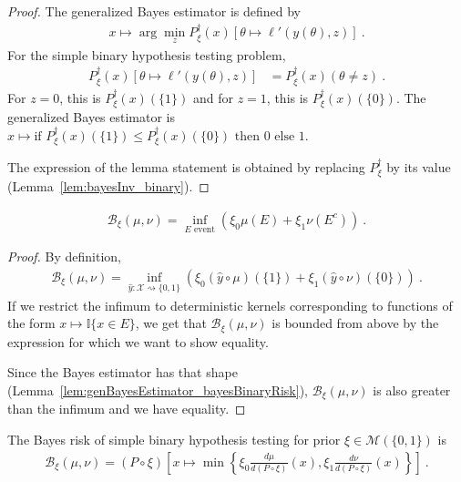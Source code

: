 \begin{proof}%
{}
The generalized Bayes estimator is defined by
\begin{align*}
x \mapsto \arg\min_z P_\xi^\dagger(x)\left[\theta \mapsto \ell'(y(\theta), z)\right] \: .
\end{align*}
For the simple binary hypothesis testing problem,
\begin{align*}
P_\xi^\dagger(x)\left[\theta \mapsto \ell'(y(\theta), z)\right]
&= P_\xi^\dagger(x)(\theta \ne z)
\: .
\end{align*}
For $z = 0$, this is $P_\xi^\dagger(x)(\{1\})$ and for $z = 1$, this is $P_\xi^\dagger(x)(\{0\})$.
The generalized Bayes estimator is $x \mapsto \text{if } P_\xi^\dagger(x)(\{1\}) \le P_\xi^\dagger(x)(\{0\}) \text{ then } 0 \text{ else } 1$.

The expression of the lemma statement is obtained by replacing $P_\xi^\dagger$ by its value (Lemma~\ref{lem:bayesInv_binary}).
\end{proof}


\begin{lemma}
  \label{lem:bayesBinaryRisk_eq_event}
  \leanok
  \begin{align*}
  \mathcal B_\xi(\mu, \nu) = \inf_{E \text{ event}} \left( \xi_0 \mu(E) + \xi_1 \nu(E^c) \right) \: .
  \end{align*}
\end{lemma}

\begin{proof}%
{}
By definition,
\begin{align*}
\mathcal B_\xi(\mu, \nu)
= \inf_{\hat{y} : \mathcal X \rightsquigarrow \{0,1\}}\left(\xi_0 (\hat{y} \circ \mu)(\{1\}) + \xi_1 (\hat{y} \circ \nu)(\{0\})\right)
\: .
\end{align*}
If we restrict the infimum to deterministic kernels corresponding to functions of the form $x \mapsto \mathbb{I}\{x \in E\}$, we get that $\mathcal B_\xi(\mu, \nu)$ is bounded from above by the expression for which we want to show equality.

Since the Bayes estimator has that shape (Lemma~\ref{lem:genBayesEstimator_bayesBinaryRisk}), $\mathcal B_\xi(\mu, \nu)$ is also greater than the infimum and we have equality.
\end{proof}


\begin{theorem}
  \label{thm:bayesBinaryRisk_eq}
  The Bayes risk of simple binary hypothesis testing for prior $\xi \in \mathcal M(\{0,1\})$ is
  \begin{align*}
  \mathcal B_\xi(\mu, \nu) = (P \circ \xi)\left[x \mapsto \min \left\{\xi_0\frac{d \mu}{d(P \circ \xi)}(x), \xi_1\frac{d \nu}{d(P \circ \xi)}(x)\right\}\right]
  \: .
  \end{align*}
\end{theorem}

